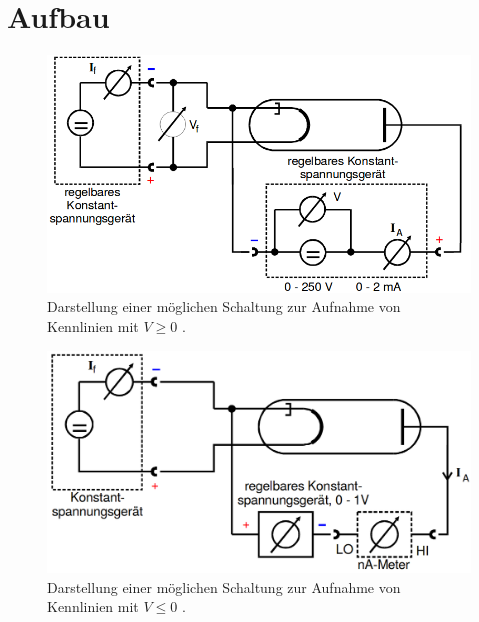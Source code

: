 \section{Aufbau}
\label{sec:Aufbau}
\begin{figure}
	\centering
	\includegraphics[width=\linewidth-100pt,height=\textheight-100pt,keepaspectratio]{content/Bilder/Schaltung1.png}
	\caption{Darstellung einer möglichen Schaltung zur Aufnahme von Kennlinien mit $V\ge0$ \cite{V504}.}
	\label{fig:Schaltung1}
\end{figure}

\begin{figure}
	\centering
	\includegraphics[width=\linewidth-100pt,height=\textheight-100pt,keepaspectratio]{content/Bilder/Schaltung2.png}
	\caption{Darstellung einer möglichen Schaltung zur Aufnahme von Kennlinien mit $V\le0$ \cite{V504}.}
	\label{fig:Schaltung2}
\end{figure}

